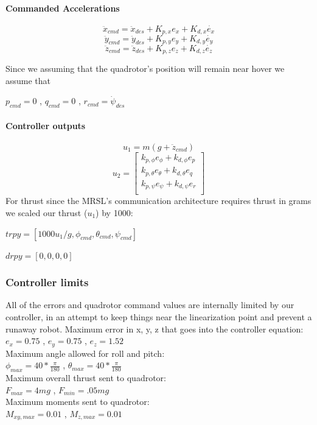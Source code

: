 \documentclass[english, twocolumn]{article}
\begin{document}
\paragraph{Commanded Accelerations}
$$\ddot{x}_{cmd} = \ddot{x}_{des} + K_{p,x} {e_{x}} + K_{d,x} {\dot{e_{x}}}$$
$$\ddot{y}_{cmd} = \ddot{y}_{des} + K_{p,y} {e_{y}} + K_{d,y} {\dot{e_{y}}}$$
$$\ddot{z}_{cmd} = \ddot{z}_{des} + K_{p,z} {e_{z}} + K_{d,z} {\dot{e_{z}}}$$ 

Since we assuming that the quadrotor's position will remain near hover we assume that \\
\begin{center}
$ p_{cmd} = 0 $ ,  $ q_{cmd} = 0$ ,  $r_{cmd} = \dot{\psi}_{des} $
\end{center}

\paragraph{Controller outputs }
$$u_1 = m(g + \ddot{z}_{cmd}) $$
$$u _2 = \left[ \begin{matrix} 
k_{p,\phi} e_{\phi} + k_{d,\phi} e_{p}\\
k_{p,\theta} e_{\theta} + k_{d,\theta} e_{q}\\
k_{p,\psi} e_{\psi} + k_{d,\psi} e_r\\
\end{matrix} \right]
$$
For thrust since the MRSL's communication architecture requires thrust in grams we scaled our thrust ($u_1$) by 1000:

$trpy = [1000u_1/g, \phi_{cmd}, \theta_{cmd}, \psi_{cmd}]$

$drpy = [0, 0, 0, 0]$
\subsubsection*{Controller limits}
All of the errors and quadrotor command values are internally limited by our controller, in an attempt to keep things near the linearization point and prevent a runaway robot.
\linebreak
\linebreak
Maximum error in x, y, z that goes into the controller equation:\\
 $e_x = 0.75 $ , $e_y =0.75$ ,  $e_z = 1.52$  \\
\linebreak
Maximum angle allowed for roll and pitch:\\
$\phi_{max} = 40 * \frac{\pi}{180}$ ,
$\theta_{max} = 40 * \frac{\pi}{180}$\\
\linebreak
Maximum overall thrust sent to quadrotor: \\ 
$F_{max} = 4mg$ ,
$F_{min} = .05mg$\\
\linebreak
Maximum moments sent to quadrotor:\\
$M_{xy, max} = 0.01$ ,
$M_{z, max} = 0.01$
\end{document}
